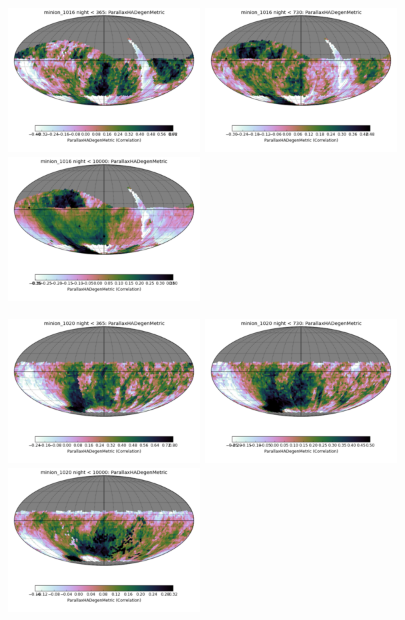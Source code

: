 \begin{figure}[ht]
  \begin{center}
  \includegraphics[width=2.0in]{./figs/milkyway/astromPanels/MW_Astrom_paDegen_Baseline_01y_map.png}
  \includegraphics[width=2.0in]{./figs/milkyway/astromPanels/MW_Astrom_paDegen_Baseline_02y_map.png}
  \includegraphics[width=2.0in]{./figs/milkyway/astromPanels/MW_Astrom_paDegen_Baseline_10y_map.png}
  \end{center}
  \begin{center}
  \includegraphics[width=2.0in]{./figs/milkyway/astromPanels/MW_Astrom_paDegen_PanSTARRS_01y_map.png}
  \includegraphics[width=2.0in]{./figs/milkyway/astromPanels/MW_Astrom_paDegen_PanSTARRS_02y_map.png}
  \includegraphics[width=2.0in]{./figs/milkyway/astromPanels/MW_Astrom_paDegen_PanSTARRS_10y_map.png}
  \end{center}


\end{figure}
